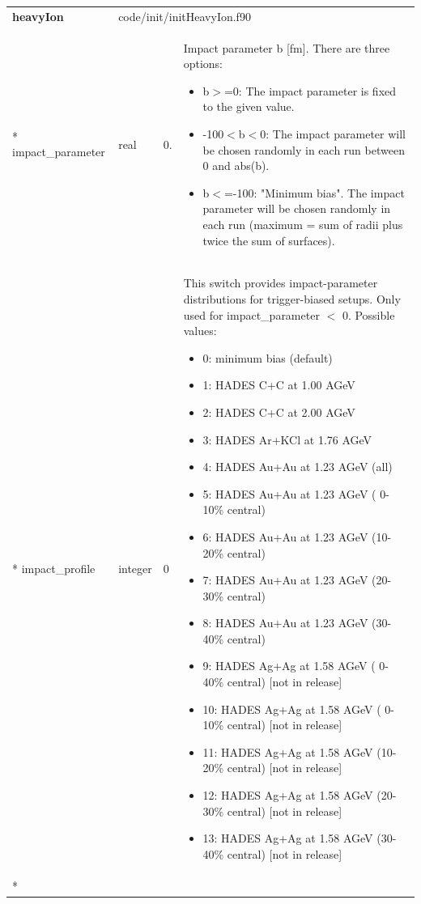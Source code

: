 \documentclass{article}
\begin{document}
\begin{longtable}{llll}
\toprule
\textbf{\large{heavyIon}} & \multicolumn{3}{l}{\footnotesize{code/init/initHeavyIon.f90}}\\*
\midrule
\endfirsthead
\midrule
\endhead
impact\_parameter & \begin{minipage}[t]{2cm}real\end{minipage} & \begin{minipage}[t]{2cm}0.\end{minipage} & \begin{minipage}[t]{12cm}Impact parameter b [fm]. There are three options:\begin{itemize}\leftmargin0em\itemindent0pt\item b$>$=0: The impact parameter is fixed to the given value.\item -100$<$b$<$0: The impact parameter will be chosen randomly in each run   between 0 and abs(b).\item b$<$=-100: "Minimum bias". The impact parameter will be chosen randomly   in each run (maximum = sum of radii plus twice the sum of surfaces).\end{itemize}\end{minipage}\\*
\midrule
impact\_profile & \begin{minipage}[t]{2cm}integer\end{minipage} & \begin{minipage}[t]{2cm}0\end{minipage} & \begin{minipage}[t]{12cm}This switch provides impact-parameter distributions for trigger-biased setups. Only used for impact\_parameter $<$ 0. Possible values:\begin{itemize}\leftmargin0em\itemindent0pt\item  0: minimum bias (default)\item  1: HADES C+C    at 1.00 AGeV\item  2: HADES C+C    at 2.00 AGeV\item  3: HADES Ar+KCl at 1.76 AGeV\item  4: HADES Au+Au  at 1.23 AGeV (all)\item  5: HADES Au+Au  at 1.23 AGeV ( 0-10\% central)\item  6: HADES Au+Au  at 1.23 AGeV (10-20\% central)\item  7: HADES Au+Au  at 1.23 AGeV (20-30\% central)\item  8: HADES Au+Au  at 1.23 AGeV (30-40\% central)\item  9: HADES Ag+Ag  at 1.58 AGeV ( 0-40\% central) [not in release]\item 10: HADES Ag+Ag  at 1.58 AGeV ( 0-10\% central) [not in release]\item 11: HADES Ag+Ag  at 1.58 AGeV (10-20\% central) [not in release]\item 12: HADES Ag+Ag  at 1.58 AGeV (20-30\% central) [not in release]\item 13: HADES Ag+Ag  at 1.58 AGeV (30-40\% central) [not in release]\end{itemize}\end{minipage}\\*

\end{longtable}
\end{document}
